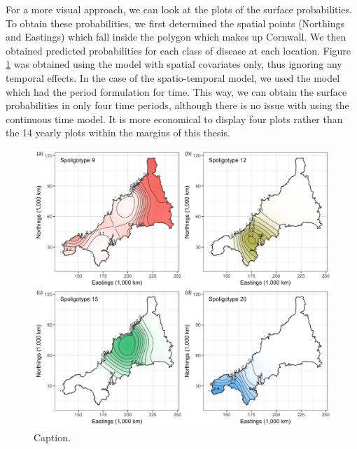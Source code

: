 \documentclass[a4paper,showframe,11pt]{report}\usepackage[]{graphicx}\usepackage[]{color}
\newenvironment{knitrout}{}{} %
\begin{document}
For a more visual approach, we can look at the plots of the surface probabilities.
To obtain these probabilities, we first determined the spatial points (Northings and Eastings) which fall inside the polygon which makes up Cornwall.
We then obtained predicted probabilities for each class of disease at each location.
Figure \ref{fig:plot.btb} was obtained using the model with spatial covariates only, thus ignoring any temporal effects.
In the case of the spatio-temporal model, we used the model which had the period formulation for time.
This way, we can obtain the surface probabilities in only four time periods, although there is no issue with using the continuous time model.
It is more economical to display four plots rather than the 14 yearly plots within the margins of this thesis.


\begin{knitrout}
\color{fgcolor}\begin{figure}[h]

{\centering \includegraphics[width=\linewidth]{figure/plot_btb-1} 

}

\caption[Caption]{Caption.}\label{fig:plot.btb}
\end{figure}


\end{knitrout}
\end{document}
